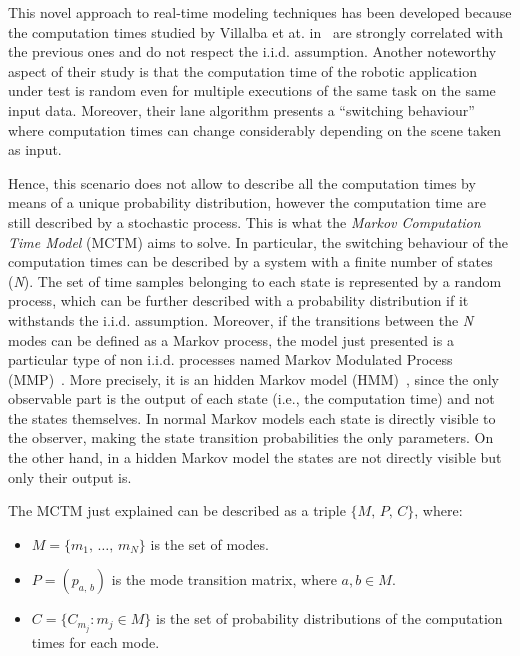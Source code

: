 This novel approach to real-time modeling techniques has been developed because the
computation times studied by Villalba et at. in~\cite{villalba2017probabilistic}
are strongly correlated with the previous ones and do not respect the i.i.d.
assumption. Another noteworthy aspect of their study is that the
computation time of the robotic application under test is random even for multiple
executions of the same task on the same input data.
Moreover, their lane algorithm presents a ``switching behaviour'' where computation
times can change considerably depending on the scene taken as input.

Hence, this scenario does not allow to describe all the computation times by means
of a unique probability distribution, however the computation time are still described
by a stochastic process. This is what the \emph{Markov Computation Time Model}
(MCTM) aims to solve. In particular, the switching behaviour of the
computation times can be described by a system with a finite number of states
(\emph{N}). The set of time samples belonging to each state is represented
by a random process, which can be further described with a probability
distribution if it withstands the i.i.d. assumption.
Moreover, if the transitions between the \emph{N} modes can be defined as a Markov
process, the model just presented is a particular type of non i.i.d. processes
named Markov Modulated Process (MMP)~\cite{fischer1993markov}.
More precisely, it is an hidden Markov model (HMM)~\cite{eddy1996hidden}, since
the only observable part is the output of each state (i.e., the computation time)
and not the states themselves. In normal Markov models each
state is directly visible to the observer, making the state transition probabilities
the only parameters. On the other hand, in a hidden Markov model the states are
not directly visible but only their output is.

The MCTM just explained can be described as a triple \(\{M,\,P,\,C\}\), where:
\begin{itemize}
    \item \( M = \{ m_1,\,\dots,\,m_N \} \) is the set of modes.
    \item \( P = (p_{a,\,b}) \) is the mode transition matrix, where
        \(a, b \in M\).
    \item \( C = \{ C_{m_j} : m_j \in M \} \) is the set of probability
        distributions of the computation times for each mode.
\end{itemize}


